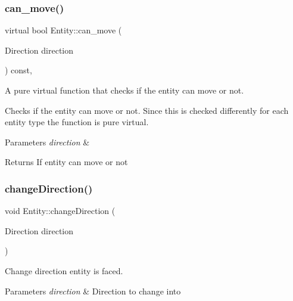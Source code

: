 \subsubsection{\texorpdfstring{can\+\_\+move()}{can\_move()}}
{\footnotesize\ttfamily virtual bool Entity\+::can\+\_\+move (\begin{DoxyParamCaption}\item[{Direction}]{direction }\end{DoxyParamCaption}) const\hspace{0.3cm}{\ttfamily [protected]}, {}}



A pure virtual function that checks if the entity can move or not. 

Checks if the entity can move or not. Since this is checked differently for each entity type the function is pure virtual. 
\begin{DoxyParams}{Parameters}
{\em direction} & \\
\hline
\end{DoxyParams}
\begin{DoxyReturn}{Returns}
If entity can move or not 
\end{DoxyReturn}
\mbox{\label{classEntity_a8c7f316068b48003621f301b24d6ff47}} 
\subsubsection{\texorpdfstring{change\+Direction()}{changeDirection()}}
{\footnotesize\ttfamily void Entity\+::change\+Direction (\begin{DoxyParamCaption}\item[{Direction}]{direction }\end{DoxyParamCaption})}



Change direction entity is faced. 


\begin{DoxyParams}{Parameters}
{\em direction} & Direction to change into \\
\hline
\end{DoxyParams}
\mbox{\label{classEntity_a6e758491533926eb0c27d4ddad83a210}} 
